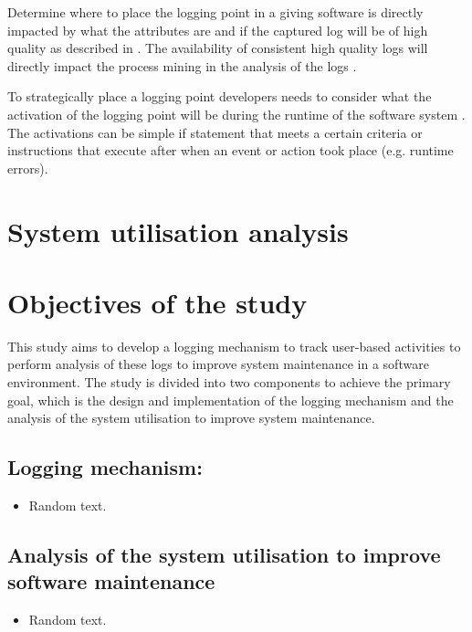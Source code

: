 Determine where to place the logging point in a giving software is directly impacted by what the attributes are and if the captured log will be of high quality as described in . The availability of consistent high quality logs will directly impact the process mining in the analysis of the logs \cite{Kherbouche2017}.\par To strategically place a logging point developers needs to consider what the activation of the logging point will be during the runtime of the software system \cite{Pecchia2015,Cinque2013}. The activations can be simple if statement that meets a certain criteria or instructions that execute after when an event or action took place (e.g. runtime errors).

\clearpage

\section{System utilisation analysis}\label{sec:SystemUtilisation}

\clearpage

\section{Objectives of the study}
This study aims to develop a logging mechanism to track user-based activities to perform analysis of these logs to improve system maintenance in a software environment. The study is divided into two components to achieve the primary goal, which is the design and implementation of the logging mechanism and the analysis of the system utilisation to improve system maintenance.

\subsection{Logging mechanism:}
\begin{itemize}
	\item Random text.
\end{itemize}

\subsection{Analysis of the system utilisation to improve software maintenance}
\begin{itemize}
	\item Random text.
\end{itemize}

